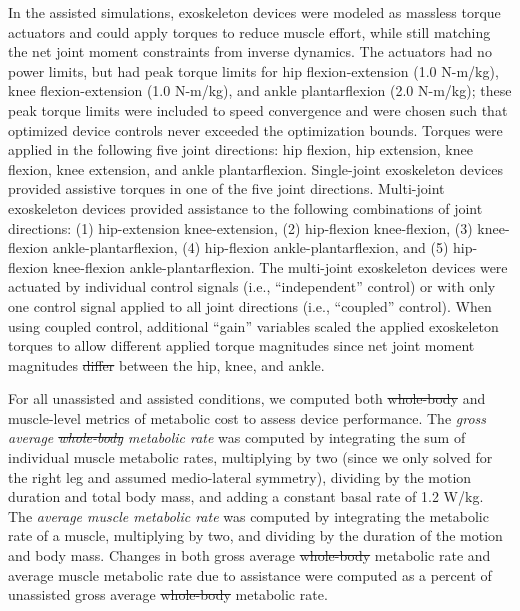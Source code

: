 \documentclass[10pt,letterpaper]{article}
\providecommand{\DIFaddtex}[1]{{\protect\color{blue}\uwave{#1}}} %
\providecommand{\DIFdeltex}[1]{{\protect\color{red}\sout{#1}}}                      %
\providecommand{\DIFaddbegin}{} %
\providecommand{\DIFaddend}{} %
\providecommand{\DIFdelbegin}{} %
\providecommand{\DIFdelend}{} %
\providecommand{\DIFadd}[1]{\texorpdfstring{\DIFaddtex{#1}}{#1}} %
\providecommand{\DIFdel}[1]{\texorpdfstring{\DIFdeltex{#1}}{}} %
\newcommand{\DIFscaledelfig}{0.5}
\newlength{\DIFdelgraphicswidth} %
\newlength{\DIFdelgraphicsheight} %
\newcommand{\DIFaddincludegraphics}[2][]{{\color{blue}\fbox{\DIFOincludegraphics[#1]{#2}}}} %
\newcommand{\DIFdelincludegraphics}[2][]{%
\sbox{\DIFdelgraphicsbox}{\DIFOincludegraphics[#1]{#2}}%
\settoboxwidth{\DIFdelgraphicswidth}{\DIFdelgraphicsbox} %
\settoboxtotalheight{\DIFdelgraphicsheight}{\DIFdelgraphicsbox} %
\scalebox{\DIFscaledelfig}{%
\parbox[b]{\DIFdelgraphicswidth}{\usebox{\DIFdelgraphicsbox}\\[-\baselineskip] \rule{\DIFdelgraphicswidth}{0em}}\llap{\resizebox{\DIFdelgraphicswidth}{\DIFdelgraphicsheight}{%
\setlength{\unitlength}{\DIFdelgraphicswidth}%
\begin{picture}(1,1)%
\thicklines\linethickness{2pt} %
{\color[rgb]{1,0,0}\put(0,0){\framebox(1,1){}}}%
{\color[rgb]{1,0,0}\put(0,0){\line( 1,1){1}}}%
{\color[rgb]{1,0,0}\put(0,1){\line(1,-1){1}}}%
\end{picture}%
}\hspace*{3pt}}} %
} %
\DeclareRobustCommand{\DIFaddbegin}{\DIFOaddbegin \let\includegraphics\DIFaddincludegraphics} %
\DeclareRobustCommand{\DIFaddend}{\DIFOaddend \let\includegraphics\DIFOincludegraphics} %
\DeclareRobustCommand{\DIFdelbegin}{\DIFOdelbegin \let\includegraphics\DIFdelincludegraphics} %
\DeclareRobustCommand{\DIFdelend}{\DIFOaddend \let\includegraphics\DIFOincludegraphics} %
\begin{document}
In the assisted simulations, exoskeleton devices were modeled as massless torque actuators and could apply torques to reduce muscle effort, while still matching the net joint moment constraints from inverse dynamics. The actuators had no power limits, but had peak torque limits for hip flexion-extension (1.0 N-m/kg), knee flexion-extension (1.0 N-m/kg), and ankle plantarflexion (2.0 N-m/kg); these peak torque limits were included to speed convergence and were chosen such that optimized device controls never exceeded the optimization bounds. Torques were applied in the following five joint directions: hip flexion, hip extension, knee flexion, knee extension, and ankle plantarflexion. Single-joint exoskeleton devices provided assistive torques in one of the five joint directions. Multi-joint exoskeleton devices provided assistance to the following combinations of joint directions: (1) hip-extension knee-extension, (2) hip-flexion knee-flexion, (3) knee-flexion ankle-plantarflexion, (4) hip-flexion ankle-plantarflexion, and (5) hip-flexion knee-flexion ankle-plantarflexion. The multi-joint exoskeleton devices were actuated by individual control signals (i.e., ``independent'' control) or with only one control signal applied to all joint directions (i.e., ``coupled'' control). When using coupled control, additional ``gain'' variables scaled the applied exoskeleton torques to allow different applied torque magnitudes since net joint moment magnitudes \DIFdelbegin \DIFdel{differ }\DIFdelend \DIFaddbegin \DIFadd{differed }\DIFaddend between the hip, knee, and ankle.

For all unassisted and assisted conditions, we computed both \DIFdelbegin \DIFdel{whole-body }\DIFdelend \DIFaddbegin \DIFadd{total }\DIFaddend and muscle-level metrics of metabolic cost to assess device performance. The \textit{gross average \DIFdelbegin \DIFdel{whole-body }\DIFdelend \DIFaddbegin \DIFadd{total }\DIFaddend metabolic rate} was computed by integrating the sum of individual muscle metabolic rates, multiplying by two (since we only solved for the right leg and assumed medio-lateral symmetry), dividing by the motion duration and total body mass, and adding a constant basal rate of 1.2 W/kg\DIFaddbegin \DIFadd{~\mbox{%
\cite{Umberger:2003}}\hspace{0pt}%
}\DIFaddend . The \textit{average muscle metabolic rate} was computed by integrating the metabolic rate of a muscle, multiplying by two, and dividing by the duration of the motion and body mass. Changes in both gross average \DIFdelbegin \DIFdel{whole-body }\DIFdelend \DIFaddbegin \DIFadd{total }\DIFaddend metabolic rate and average muscle metabolic rate due to assistance were computed as a percent of unassisted gross average \DIFdelbegin \DIFdel{whole-body }\DIFdelend \DIFaddbegin \DIFadd{total }\DIFaddend metabolic rate.
\end{document}
